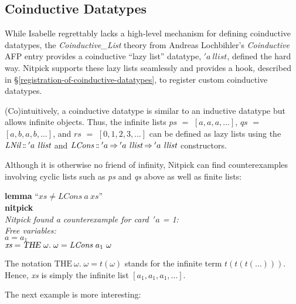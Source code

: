 \documentclass[a4paper,12pt]{article}
\def\Colon{\mathord{:\mkern-1.5mu:}}
\begin{document}
\subsection{Coinductive Datatypes}
\label{coinductive-datatypes}

While Isabelle regrettably lacks a high-level mechanism for defining coinductive
datatypes, the \textit{Coinductive\_List} theory from Andreas Lochbihler's
\textit{Coinductive} AFP entry \cite{lochbihler-2010} provides a coinductive
``lazy list'' datatype, $'a~\textit{llist}$, defined the hard way. Nitpick
supports these lazy lists seamlessly and provides a hook, described in
\S\ref{registration-of-coinductive-datatypes}, to register custom coinductive
datatypes.

(Co)intuitively, a coinductive datatype is similar to an inductive datatype but
allows infinite objects. Thus, the infinite lists $\textit{ps}$ $=$ $[a, a, a,
\ldots]$, $\textit{qs}$ $=$ $[a, b, a, b, \ldots]$, and $\textit{rs}$ $=$ $[0,
1, 2, 3, \ldots]$ can be defined as lazy lists using the
$\textit{LNil}\mathbin{\Colon}{'}a~\textit{llist}$ and
$\textit{LCons}\mathbin{\Colon}{'}a \mathbin{\Rightarrow} {'}a~\textit{llist}
\mathbin{\Rightarrow} {'}a~\textit{llist}$ constructors.

Although it is otherwise no friend of infinity, Nitpick can find counterexamples
involving cyclic lists such as \textit{ps} and \textit{qs} above as well as
finite lists:

\prew
\textbf{lemma} ``$\textit{xs} \not= \textit{LCons}~a~\textit{xs}$'' \\
\textbf{nitpick} \\[2\smallskipamount]
\slshape Nitpick found a counterexample for {\itshape card}~$'a$ = 1: \\[2\smallskipamount]
\hbox{}\qquad Free variables: \nopagebreak \\
\hbox{}\qquad\qquad $\textit{a} = a_1$ \\
\hbox{}\qquad\qquad $\textit{xs} = \textsl{THE}~\omega.\; \omega = \textit{LCons}~a_1~\omega$
\postw

The notation $\textrm{THE}~\omega.\; \omega = t(\omega)$ stands
for the infinite term $t(t(t(\ldots)))$. Hence, \textit{xs} is simply the
infinite list $[a_1, a_1, a_1, \ldots]$.

The next example is more interesting:
\end{document}
